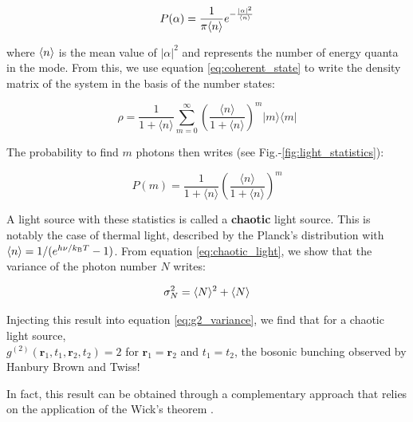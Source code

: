 \begin{equation}
    P(\alpha)= \frac{1}{\pi \langle n\rangle} e^{-\frac{|\alpha|^2}{\langle n\rangle}}
    \label{eq:p_alpha}
\end{equation}

\noindent where $\langle n\rangle$ is the mean value of $|\alpha|^2$ and represents the number of energy quanta in the mode. From this, we use equation \ref{eq:coherent_state} to write the density matrix of the system in the basis of the number states:

\begin{equation}
    \hat{\rho}=\frac{1}{1+\langle n\rangle} \sum_{m=0}^{\infty}\left(\frac{\langle n\rangle}{1+\langle n\rangle}\right)^{m}|m\rangle\langle m|
    \label{eq:rho_chaotic}
\end{equation}

\noindent The probability to find $m$ photons then writes (see Fig.-\ref{fig:light_statistics}):

\begin{equation}
    P(m)=\frac{1}{1+\langle n\rangle}\left(\frac{\langle n\rangle}{1+\langle n\rangle}\right)^{m}
    \label{eq:chaotic_light}
\end{equation}


\noindent A light source with these statistics is called a \textbf{chaotic} light source. This is notably the case of thermal light, described by the Planck's distribution with $\langle n\rangle=1/(e^{h\nu/k_{\mathrm{B}} T}-1)$. From equation \ref{eq:chaotic_light}, we show that the variance of the photon number $N$ writes:

\begin{equation}
    \sigma_N^2=\langle N\rangle^2+\langle N\rangle
\end{equation}

\noindent Injecting this result into equation \ref{eq:g2_variance}, we find that for a chaotic light source, \\ $g^{(2)}\left(\bm{r}_{1}, t_{1}, \bm{r}_{2}, t_{2}\right)=2$ for $\bm{r}_{1}=\bm{r}_{2}$ and $t_1=t_2$, the bosonic bunching observed by Hanbury Brown and Twiss!




In fact, this result can be obtained through a complementary approach that relies on the application of the Wick's theorem \cite{gardiner2000quantum}.

